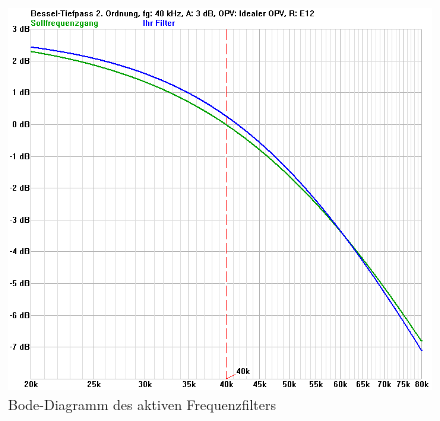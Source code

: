 \begin{figure}[H]
\centering
\includegraphics[width=(\textwidth), angle=0]{images/bode.png}
\caption{Bode-Diagramm des aktiven Frequenzfilters} \label{img:bode}
\end{figure}


